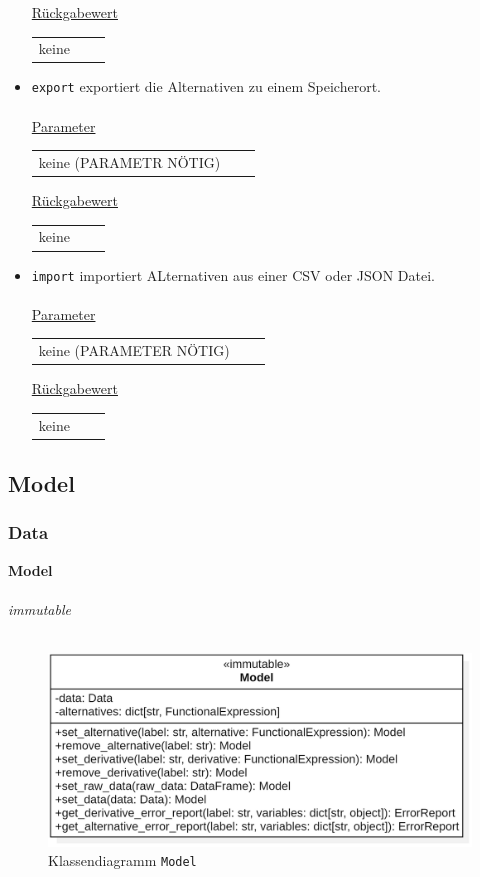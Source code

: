 \documentclass{article}
\begin{document}
\begin{itemize}
\underline{{Rückgabewert}}
\begin{tabular}{lll}
keine \\
\end{tabular}

\item \texttt{export} \newline exportiert die Alternativen zu einem Speicherort. 
\\\\
\underline{{Parameter}} 
\begin{tabular}{lll}
keine (PARAMETR NÖTIG)\\
\end{tabular}

\underline{{Rückgabewert}}
\begin{tabular}{lll}
keine\\
\end{tabular}

\item \texttt{import} \newline importiert ALternativen aus einer CSV oder JSON Datei.
\\\\
\underline{{Parameter}} 
\begin{tabular}{lll}
keine (PARAMETER NÖTIG) \\
\end{tabular}

\underline{{Rückgabewert}}
\begin{tabular}{lll}
keine \\
\end{tabular}

\end{itemize}

\newpage
\subsection{Model}
\subsubsection{Data}
\textbf{\large{Model}}\\\\
\textit{\flqq{}immutable\frqq}\normalsize\\\\
\begin{figure}[H]%
    \centering
    \includegraphics[width=13cm]{entwurf/Entwurf_dokument/img/cls/model/Model.png}
    \caption{Klassendiagramm \texttt{Model}}
\end{figure}
\end{document}
